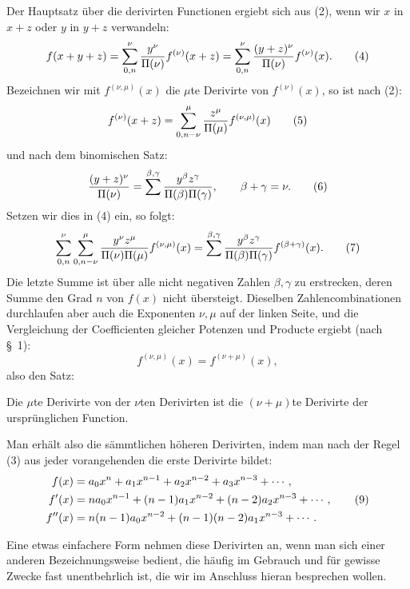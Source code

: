 \documentclass[11pt]{article}
\begin{document}
Der Hauptsatz über die derivirten Functionen ergiebt sich aus (2), wenn wir $x$ in $x+z$ oder $y$ in $y+z$ verwandeln:
\begin{equation}
 f(x+y+z)=\sum_{0,n}^{\nu}{y^\nu\over\Pi(\nu)}f^{(\nu)}(x+z)
 =\sum_{0,n}^{\nu}{(y+z)^\nu\over\Pi(\nu)}f^{(\nu)}(x).
\tag{4}
\end{equation}
Bezeichnen wir mit $f^{(\nu,\mu)}(x)$ die $\mu$te Derivirte von $f^{(\nu)}(x)$, so ist nach (2):
\begin{equation}
 f^{(\nu)}(x+z)=\sum_{0,n-\nu}^{\mu}{z^\mu\over\Pi(\mu)}f^{(\nu,\mu)}(x)
\tag{5}
\end{equation}
und nach dem binomischen Satz:
\begin{equation}
 { (y+z)^\nu\over\Pi(\nu)}
 =\sum^{\beta,\gamma}{y^\beta z^\gamma\over\Pi(\beta)\Pi(\gamma)},
 \qquad \beta+\gamma=\nu.
\tag{6}
\end{equation}
Setzen wir dies in (4) ein, so folgt:
\begin{equation}
 \sum_{0,n}^{\nu}\sum_{0,n-\nu}^{\mu}
 {y^\nu z^\mu\over\Pi(\nu)\Pi(\mu)}f^{(\nu,\mu)}(x)
 =
 \sum^{\beta,\gamma}
 {y^\beta z^\gamma\over\Pi(\beta)\Pi(\gamma)}f^{(\beta+\gamma)}(x).
\tag{7}
\end{equation}
Die letzte Summe ist über alle nicht negativen Zahlen $\beta,\gamma$ zu erstrecken, deren Summe den Grad $n$ von $f(x)$ nicht übersteigt. Dieselben Zahlencombinationen durchlaufen aber auch die Exponenten $\nu,\mu$ auf der linken Seite, und die Vergleichung der Coefficienten gleicher Potenzen und Producte ergiebt (nach \S~1):
\begin{equation}
 f^{(\nu,\mu)}(x)=f^{(\nu+\mu)}(x),
\tag{8}
\end{equation}
also den Satz:

Die $\mu$te Derivirte von der $\nu$ten Derivirten ist die $(\nu+\mu)$te Derivirte der ursprünglichen Function.

Man erhält also die sämmtlichen höheren Derivirten, indem man nach der Regel (3) aus jeder vorangehenden die erste Derivirte bildet:
\begin{align}
 f(x)&=a_0x^n+a_1x^{n-1}+a_2x^{n-2}+a_3x^{n-3}+\cdots,\notag\\
 f'(x)&=na_0x^{n-1}+(n-1)a_1x^{n-2}+(n-2)a_2x^{n-3}+\cdots, \tag{9}\\
 f''(x)&=n(n-1)a_0x^{n-2}+(n-1)(n-2)a_1x^{n-3}+\cdots. \notag
\end{align}

Eine etwas einfachere Form nehmen diese Derivirten an, wenn man sich einer anderen Bezeichnungsweise bedient, die häufig im Gebrauch und für gewisse Zwecke fast unentbehrlich ist, die wir im Anschluss hieran besprechen wollen.
\end{document}
